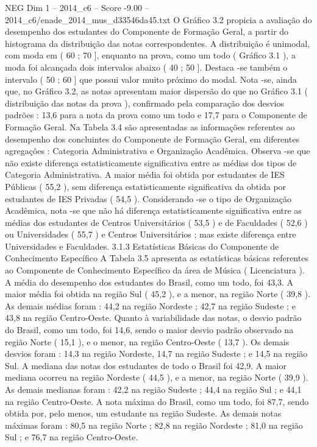\begin{textsample}{NEG Dim 1 – 2014\_c6 – Score -9.00 – 2014\_c6/enade\_2014\_mus\_d33546da45.txt}
O Gráfico 3.2 propicia a avaliação do desempenho dos estudantes do Componente de Formação Geral, a partir do histograma da distribuição das notas correspondentes.
A distribuição é unimodal, com moda em ( 60 ; 70 ], enquanto na prova, como um todo ( Gráfico 3.1 ), a moda foi alcançada dois intervalos abaixo ( 40 ; 50 ].
Destaca -se também o intervalo ( 50 ; 60 ] que possui valor muito próximo do modal.
Nota -se, ainda que, no Gráfico 3.2, as notas apresentam maior dispersão do que no Gráfico 3.1 ( distribuição das notas da prova ), confirmado pela comparação dos desvios padrões : 13,6 para a nota da prova como um todo e 17,7 para o Componente de Formação Geral.
Na Tabela 3.4 são apresentadas as informações referentes ao desempenho dos concluintes do Componente de Formação Geral, em diferentes agregações : Categoria Administrativa e Organização Acadêmica.
Observa -se que não existe diferença estatisticamente significativa entre as médias dos tipos de Categoria Administrativa.
A maior média foi obtida por estudantes de IES Públicas ( 55,2 ), sem diferença estatisticamente significativa da obtida por estudantes de IES Privadas ( 54,5 ).
Considerando -se o tipo de Organização Acadêmica, nota -se que não há diferença estatisticamente significativa entre as médias dos estudantes de Centros Universitários ( 53,5 ) e de Faculdades ( 52,6 ) ou Universidades ( 55,7 ) e Centros Universitários ; mas existe diferença entre Universidades e Faculdades. 3.1.3 Estatísticas Básicas do Componente de Conhecimento Específico A Tabela 3.5 apresenta as estatísticas básicas referentes ao Componente de Conhecimento Específico da área de Música ( Licenciatura ).
A média do desempenho dos estudantes do Brasil, como um todo, foi 43,3.
A maior média foi obtida na região Sul ( 45,2 ), e a menor, na região Norte ( 39,8 ).
As demais médias foram : 44,2 na região Nordeste ; 42,7 na região Sudeste ; e 43,8 na região Centro-Oeste.
Quanto à variabilidade das notas, o desvio padrão do Brasil, como um todo, foi 14,6, sendo o maior desvio padrão observado na região Norte ( 15,1 ), e o menor, na região Centro-Oeste ( 13,7 ).
Os demais desvios foram : 14,3 na região Nordeste, 14,7 na região Sudeste ; e 14,5 na região Sul.
A mediana das notas dos estudantes de todo o Brasil foi 42,9.
A maior mediana ocorreu na região Nordeste ( 44,5 ), e a menor, na região Norte ( 39,9 ).
As demais medianas foram : 42,2 na região Sudeste ; 44,4 na região Sul ; e 44,1 na região Centro-Oeste.
A nota máxima do Brasil, como um todo, foi 87,7, sendo obtida por, pelo menos, um estudante na região Sudeste.
As demais notas máximas foram : 80,5 na região Norte ; 82,8 na região Nordeste ; 81,0 na região Sul ; e 76,7 na região Centro-Oeste.

\end{textsample}

